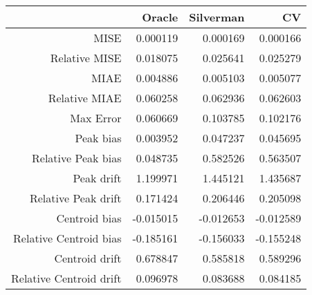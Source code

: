 \begin{tabular}{rrrr}
  \hline
 & Oracle & Silverman & CV \\ 
  \hline
MISE & 0.000119 & 0.000169 & 0.000166 \\ 
  Relative MISE & 0.018075 & 0.025641 & 0.025279 \\ 
  MIAE & 0.004886 & 0.005103 & 0.005077 \\ 
  Relative MIAE & 0.060258 & 0.062936 & 0.062603 \\ 
  Max Error & 0.060669 & 0.103785 & 0.102176 \\ 
  Peak bias & 0.003952 & 0.047237 & 0.045695 \\ 
  Relative Peak bias & 0.048735 & 0.582526 & 0.563507 \\ 
  Peak drift & 1.199971 & 1.445121 & 1.435687 \\ 
  Relative Peak drift & 0.171424 & 0.206446 & 0.205098 \\ 
  Centroid bias & -0.015015 & -0.012653 & -0.012589 \\ 
  Relative Centroid bias & -0.185161 & -0.156033 & -0.155248 \\ 
  Centroid drift & 0.678847 & 0.585818 & 0.589296 \\ 
  Relative Centroid drift & 0.096978 & 0.083688 & 0.084185 \\ 
   \hline
\end{tabular}

